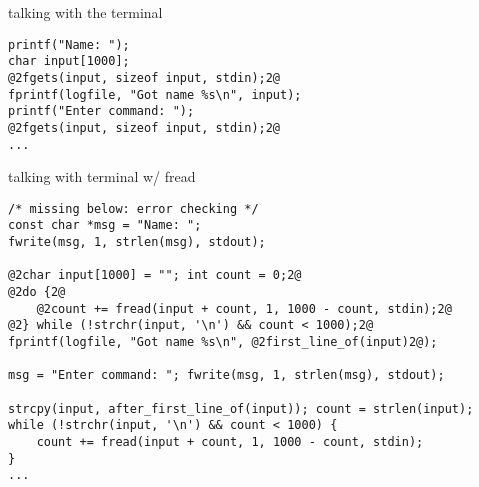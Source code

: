 \begin{frame}[fragile]{talking with the terminal}
\begin{lstlisting}
printf("Name: ");
char input[1000];
@2fgets(input, sizeof input, stdin);2@
fprintf(logfile, "Got name %s\n", input);
printf("Enter command: ");
@2fgets(input, sizeof input, stdin);2@
...
\end{lstlisting}
\end{frame}

\begin{frame}[fragile]{talking with terminal w/ fread}
\begin{lstlisting}
/* missing below: error checking */
const char *msg = "Name: ";
fwrite(msg, 1, strlen(msg), stdout);

@2char input[1000] = ""; int count = 0;2@
@2do {2@
    @2count += fread(input + count, 1, 1000 - count, stdin);2@
@2} while (!strchr(input, '\n') && count < 1000);2@
fprintf(logfile, "Got name %s\n", @2first_line_of(input)2@);

msg = "Enter command: "; fwrite(msg, 1, strlen(msg), stdout);

strcpy(input, after_first_line_of(input)); count = strlen(input);
while (!strchr(input, '\n') && count < 1000) {
    count += fread(input + count, 1, 1000 - count, stdin);
}
...
\end{lstlisting}
\end{frame}


